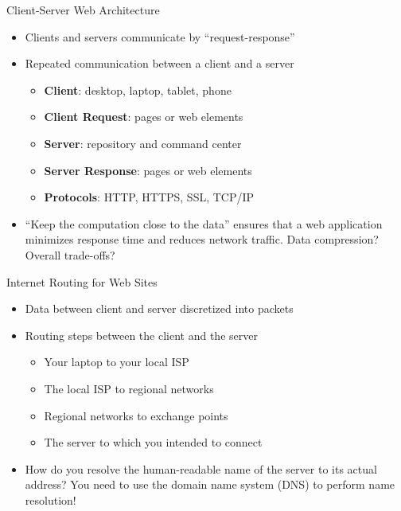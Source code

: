 \documentclass[14pt,aspectratio=169]{beamer}
\begin{document}
%
\begin{frame}{Client-Server Web Architecture}
  \begin{itemize}
    \item Clients and servers communicate by ``request-response''
      \vspace*{-.2in}
    \item Repeated communication between a client and a server
      \begin{itemize}
        \item {\bf Client}: desktop, laptop, tablet, phone
        \item {\bf Client Request}: pages or web elements
        \item {\bf Server}: repository and command center
        \item {\bf Server Response}: pages or web elements
        \item {\bf Protocols}: HTTP, HTTPS, SSL, TCP/IP
      \end{itemize}
      \vspace*{-.2in}
    \item ``Keep the computation close to the data''
      ensures that a web application minimizes response time and reduces
      network traffic. Data compression? Overall trade-offs?
  \end{itemize}
\end{frame}

%
\begin{frame}{Internet Routing for Web Sites}
  \begin{itemize}
    \item Data between client and server discretized into packets
    \item Routing steps between the client and the server
      \begin{itemize}
        \item Your laptop to your local ISP
        \item The local ISP to regional networks
        \item Regional networks to exchange points
        \item The server to which you intended to connect
      \end{itemize}
      \vspace*{-.2in}
    \item How do you resolve the human-readable name of the server to its actual
      address? You need to use the domain name system (DNS) to perform name
      resolution!
  \end{itemize}
\end{frame}
\end{document}
